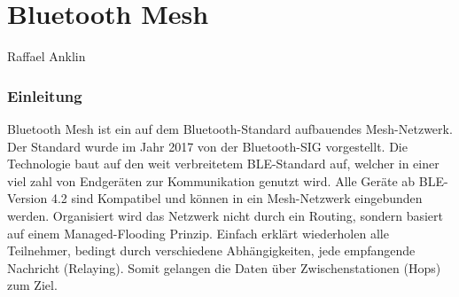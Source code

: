 \vspace*{4cm}
\part{Bluetooth Mesh}\label{part:BluetoothMesh}
Raffael Anklin
\vspace*{\fill}
\clearpage

\section{Einleitung}\label{sec:EinleitungBluetooth}


Bluetooth Mesh ist ein auf dem Bluetooth-Standard aufbauendes Mesh-Netzwerk. Der Standard wurde im Jahr 2017 von der Bluetooth-SIG vorgestellt. Die Technologie baut auf den weit verbreitetem BLE-Standard auf, welcher in einer viel zahl von Endgeräten zur Kommunikation genutzt wird. Alle Geräte ab BLE-Version 4.2 sind Kompatibel und können in ein Mesh-Netzwerk eingebunden werden. Organisiert wird das Netzwerk nicht durch ein Routing, sondern basiert auf einem Managed-Flooding Prinzip. Einfach erklärt wiederholen alle Teilnehmer, bedingt durch verschiedene Abhängigkeiten, jede empfangende Nachricht (Relaying). Somit gelangen die Daten über Zwischenstationen (Hops) zum Ziel. 









